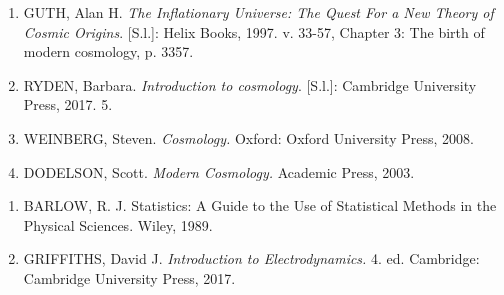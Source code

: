 \vspace{.5cm}
\begin{center}
    \textcolor{base}{\MakeUppercase{}} %
\end{center}

\begin{enumerate}
    \item \label{ref1:artigo1} GUTH, Alan H. \textit{The Inflationary Universe: The Quest For a New Theory of Cosmic Origins}. [S.l.]: Helix Books, 1997. v. 33-57, Chapter 3: The birth of modern cosmology, p. 3357.
    \item \label{ref2:artigo1} RYDEN, Barbara. \textit{Introduction to cosmology}. [S.l.]: Cambridge University Press, 2017. 5.
    \item \label{ref3:artigo1} WEINBERG, Steven. \textit{Cosmology.} Oxford: Oxford University Press, 2008.
    \item \label{ref4:artigo1} DODELSON, Scott. \textit{Modern Cosmology.} Academic Press, 2003.
\end{enumerate}

\begin{center}
    \textcolor{base}{\MakeUppercase{}}
\end{center}

\begin{enumerate}
    \item \label{ref1:artigo2} BARLOW, R. J. Statistics: A Guide to the Use of Statistical Methods in the Physical Sciences. Wiley, 1989.
    \item \label{ref3:artigo2} GRIFFITHS, David J. \textit{Introduction to Electrodynamics.} 4. ed. Cambridge: Cambridge University Press, 2017.
\end{enumerate}

\begin{center}
    \textcolor{base}{\MakeUppercase{}}
\end{center}

